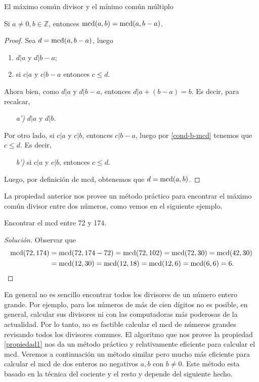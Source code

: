 \begin{section}{El máximo común divisor y el mínimo común múltiplo}
\begin{propiedad}\label{propiedad1}
    Si $a \not=0, b \in \mathbb Z$, entonces $\operatorname{mcd}(a,b) = \operatorname{mcd}(a,b-a)$. 
\end{propiedad}
\begin{proof}
    Sea $d =  \operatorname{mcd}(a,b-a)$, luego 
    \begin{enumerate}[label=\textit{\alph*)}]
        \item $ d|a$ y $d|b -a$;
        \item\label{cond-b-mcd} si $ c|a $ y $c|b -a$ entonces $ c \le d$.
    \end{enumerate}
    Ahora bien, como  $ d|a$ y $d|b -a$, entonces $  d|a +(b -a) = b$. Es decir, para recalcar,
    \begin{enumerate}
        \item[\textit{a')}] $ d|a$ y $d|b$.
    \end{enumerate}
    Por otro lado, si  $ c|a $ y $c|b$, entonces  $c|b -a$, luego por \ref{cond-b-mcd} tenemos que $c\le d$. Es decir, 
    \begin{enumerate}
        \item[\textit{b')}]si  $ c|a $ y $c|b$, entonces  $c \le d$.
    \end{enumerate}
    Luego, por definición de mcd, obtenemos que $d = \operatorname{mcd}(a,b)$.
\end{proof}

La propiedad anterior nos provee un método práctico para encontrar el máximo común divisor entre dos números, como vemos en el siguiente ejemplo.

\begin{ejemplo*} Encontrar el mcd entre 72 y 174.
    \begin{proof}[Solución] Observar que 
        \begin{align*}
        \operatorname{mcd}(72, 174) &= \operatorname{mcd}(72,174-72) = \operatorname{mcd}(72,102) = \operatorname{mcd}(72,30) =  \operatorname{mcd}(42, 30) \\&= \operatorname{mcd}(12,30) = \operatorname{mcd}(12,18)= \operatorname{mcd}(12,6)= \operatorname{mcd}(6,6) = 6.  
        \end{align*}
    \end{proof}
\end{ejemplo*} 

En  general no es sencillo encontrar todos los divisores de un número entero grande. Por ejemplo, para los  números de más de cien dígitos no es posible,  en general, calcular sus divisores ni con las computadoras más poderosas de la actualidad. Por  lo tanto, no es factible calcular el  mcd de números grandes revisando todos los divisores comunes.  El algoritmo que nos provee la  propiedad \ref{propiedad1} nos da un método práctico y relativamente eficiente para calcular el mcd. Veremos a continuación un método similar pero mucho más eficiente para calcular el mcd de dos enteros no negativos $a,b$ con $b \not=0$. Este método esta basado en la técnica del cociente y el resto y depende del siguiente hecho.


\end{section}
